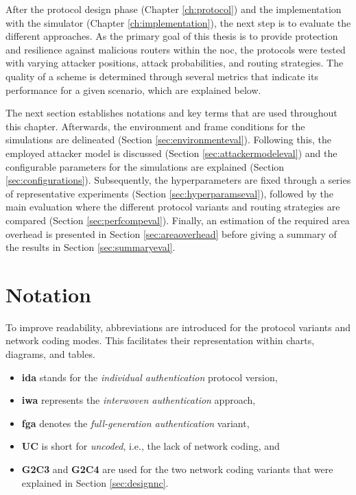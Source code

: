 After the protocol design phase (Chapter \ref{ch:protocol}) and the implementation with the simulator (Chapter \ref{ch:implementation}), the next step
is to evaluate the different approaches. As the primary goal of this thesis is to provide protection and resilience against malicious routers within
the \gls{noc}, the protocols were tested with varying attacker positions, attack probabilities, and routing strategies. The quality of a scheme
is determined through several metrics that indicate its performance for a given scenario, which are explained below.

The next section establishes notations and key terms that are used throughout this chapter. Afterwards, the environment and frame conditions for the
simulations are delineated (Section \ref{sec:environmenteval}). Following this, the employed attacker model is discussed (Section
\ref{sec:attackermodeleval}) and the configurable parameters for the simulations are explained (Section \ref{sec:configurations}). Subsequently,
the hyperparameters are fixed through a series of representative experiments (Section
\ref{sec:hyperparamseval}), followed by the main evaluation where the different protocol variants and routing strategies are compared (Section
\ref{sec:perfcompeval}). Finally, an estimation of the required area overhead is presented in Section \ref{sec:areaoverhead} before giving a summary
of the results in Section \ref{sec:summaryeval}.

\section{Notation}\label{sec:notationeval}
To improve readability, abbreviations are introduced for the protocol variants and network coding modes. This facilitates their representation within
charts, diagrams, and tables.
\begin{itemize}
    \item \textbf{\Gls{ida}} stands for the \textit{individual authentication} protocol version,
    \item \textbf{\Gls{iwa}} represents the \textit{interwoven authentication} approach,
    \item \textbf{\Gls{fga}} denotes the \textit{full-generation authentication} variant,
    \item \textbf{UC} is short for \textit{uncoded}, i.e., the lack of network coding, and
    \item \textbf{G2C3} and \textbf{G2C4} are used for the two network coding variants that were explained in Section \ref{sec:designnc}.
\end{itemize}
\pagebreak


